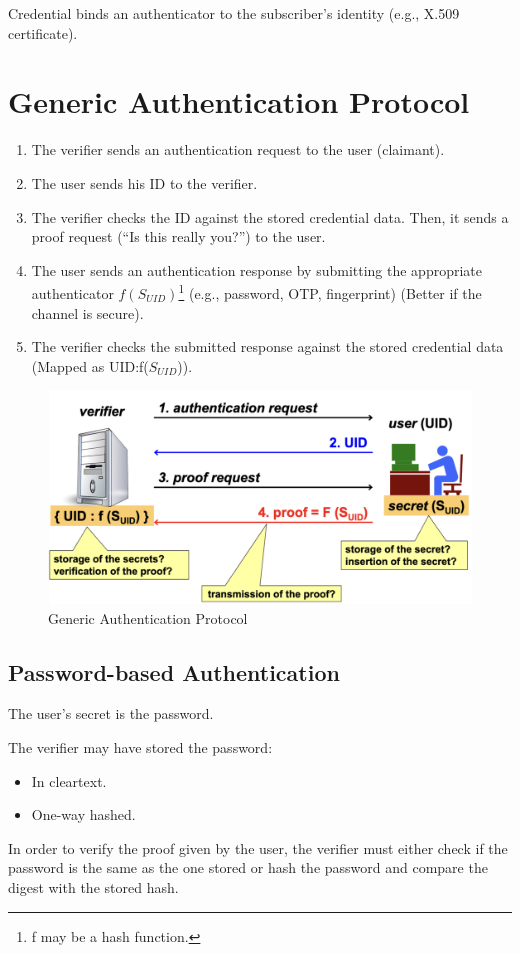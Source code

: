 \begin{tcolorbox}[colback=blue!10!white, colframe=blue!50!white]
Credential binds an authenticator to the subscriber's identity (e.g., X.509 certificate).
\end{tcolorbox}

\section{Generic Authentication Protocol}
\begin{enumerate}
    \item The verifier sends an authentication request to the user (claimant).
    \item The user sends his ID to the verifier.
    \item The verifier checks the ID against the stored credential data. Then, it sends a proof request (“Is this really you?”) to the user.
    \item The user sends an authentication response by submitting the appropriate authenticator $f(S_{UID})$\footnote{f may be a hash function.} (e.g., password, OTP, fingerprint) (Better if the channel is secure).
    \item The verifier checks the submitted response against the stored credential data (Mapped as UID:f($S_{UID}$)).
\end{enumerate}

\begin{figure}[H]
    \centering
    \includegraphics[width=0.5\linewidth]{Images/Authentication/authNprot.png}
    \caption{Generic Authentication Protocol}
\end{figure}

\subsection{Password-based Authentication}
The user's secret is the password. 

The verifier may have stored the password:
\begin{itemize}
    \item In cleartext.
    \item One-way hashed.
\end{itemize}
In order to verify the proof given by the user, the verifier must either check if the password is the same as the one stored or hash the password and compare the digest with the stored hash.

